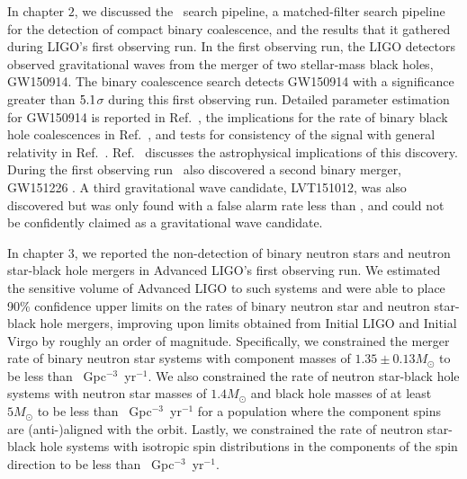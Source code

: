 
In chapter $2$, we discussed the \pycbc{}\ search pipeline, a matched-filter
search pipeline for the detection of compact binary coalescence, and the results
that it gathered during LIGO's first observing run. In the first observing run, the LIGO detectors observed
gravitational waves from the merger of two
stellar-mass black holes, GW150914. The binary coalescence search detects GW150914 with
a significance greater than $5.1$$\sigma$ during this first observing
run. Detailed parameter estimation for
GW150914 is reported in Ref.~\cite{GW150914-PARAMESTIM}, the implications for
the rate of binary black hole coalescences in Ref.~\cite{GW150914-RATES}, and
tests for consistency of the signal with general relativity in
Ref.~\cite{GW150914-TESTOFGR}.  Ref.~\cite{GW150914-ASTRO} discusses the
astrophysical implications of this discovery. During the first observing run
\pycbc{}\ also discovered a second binary merger, GW151226 \cite{Abbott:2016nmj}. A third
gravitational wave candidate, LVT151012, was also discovered but was only found
with a false alarm rate less than \CBCSECONDEVENTFAR, and could not be
confidently claimed as a gravitational wave candidate.

In chapter $3$, we reported the non-detection of binary neutron stars and neutron star-black hole mergers
in Advanced \ac{LIGO}'s first observing run.
We estimated the sensitive volume of Advanced \ac{LIGO} to such systems and were able to place 90\%
confidence upper limits on the rates of binary neutron star and neutron star-black hole mergers, improving upon limits
obtained from Initial \ac{LIGO} and Initial Virgo by roughly an order of magnitude.
Specifically, we constrained the merger rate of binary neutron star systems with component masses of $1.35\pm0.13M_{\odot}$
to be less than \MainBNSULPyCBCHighSpin~Gpc$^{-3}$~yr$^{-1}$. We also constrained
the rate of neutron star-black hole systems with neutron star masses of $1.4 M_\odot$ and black hole masses
of at least $5 M_{\odot}$ to be less than \MainNSBHULPyCBCFiveAligned~Gpc$^{-3}$~yr$^{-1}$
for a population where the component spins are (anti-)aligned with
the orbit. Lastly, we constrained the rate of neutron star-black hole systems with isotropic spin distributions in the
components of the spin direction to be less than \MainNSBHULPyCBCFiveIso~Gpc$^{-3}$~yr$^{-1}$.


